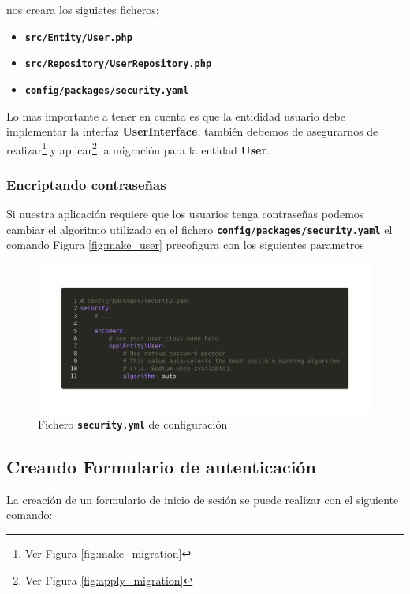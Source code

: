nos creara los siguietes ficheros:

\begin{itemize}
  \item \texttt{\textbf{src/Entity/User.php}}
  \item \texttt{\textbf{src/Repository/UserRepository.php}}
  \item \texttt{\textbf{config/packages/security.yaml}}
\end{itemize}

Lo mas importante a tener en cuenta es que la entididad usuario debe implementar la interfaz \textbf{\textbf{UserInterface}}, también debemos de asegurarnos
de realizar\footnote{Ver Figura \ref{fig:make_migration}} y aplicar\footnote{Ver Figura \ref{fig:apply_migration}} la migración para la entidad \textbf{\textbf{User}}.

\clearpage
\subsubsection{Encriptando contraseñas}
Si nuestra aplicación requiere que los usuarios tenga contraseñas podemos cambiar el algoritmo utilizado en el fichero \textbf{\texttt{config/packages/security.yaml}} el comando Figura \ref{fig:make_user} precofigura con los siguientes parametros

\begin{figure}[ht]
  \centering
  \includegraphics[width=\textwidth]{../assets/security_yml.png}
  \caption{Fichero \texttt{\textbf{security.yml}} de configuración}
  \label{fig:security_yml}
\end{figure}

\subsection{Creando Formulario de autenticación}

La creación de un formulario de inicio de sesión se puede realizar con el siguiente comando:

